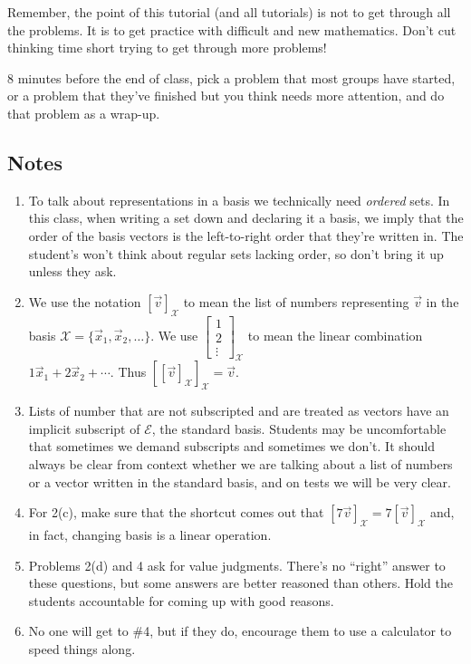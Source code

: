 \documentclass[red]{tutorial}
\newcommand{\mat}[1]{\begin{bmatrix}#1\end{bmatrix}}
\theoremstyle{definition}
\theoremstyle{theorem}
\begin{document}
\begin{instructions}
	Remember, the point of this tutorial (and all tutorials) is not to get through all the problems.
	It is to get practice with difficult and new mathematics. Don't cut thinking time short trying
	to get through more problems!

	8 minutes before the end of class, pick a problem that most groups have started, or a problem
		that they've finished but you think needs more attention, and do that problem as a wrap-up.


\subsection*{Notes}
		\begin{enumerate}
			\item To talk about representations in a basis we technically need \emph{ordered} sets. In this class,
				when writing a set down and declaring it a basis, we imply that the order of the basis vectors
				is the left-to-right order that they're written in. The student's won't think about regular sets lacking
				order,
				so don't bring it up unless they ask.
			\item We use the notation $[\vec v]_{\mathcal X}$ to mean the list of numbers representing
				$\vec v$ in the basis $\mathcal X=\{\vec x_1,\vec x_2,\ldots\}$. We use $\mat{1\\2\\\vdots}_{\mathcal X}$ to
				mean the linear combination $1\vec x_1+2\vec x_2+\cdots$. Thus $[[\vec v]_{\mathcal X}]_{\mathcal X}=\vec v$.
			\item Lists of number that are not subscripted and are treated as vectors have an implicit
				subscript of $\mathcal E$, the standard basis. Students may be uncomfortable
				that sometimes we demand subscripts and sometimes we don't. It should always be clear from context
				whether we are talking about a list of numbers or a vector written in the standard basis, and on
				tests we will be very clear.
			\item For 2(c), make sure that the shortcut comes out that $[7\vec v]_{\mathcal X} = 7[\vec v]_{\mathcal X}$ and,
				in fact, changing basis is a linear operation.
			\item Problems 2(d) and 4 ask for value judgments. There's no ``right'' answer to these questions, but 
				some answers are better reasoned than others. Hold the students accountable for coming
				up with good reasons.
			\item No one will get to \#4, but if they do, encourage them to use a calculator to speed things along.
		\end{enumerate}
	\end{instructions}
\end{document}

